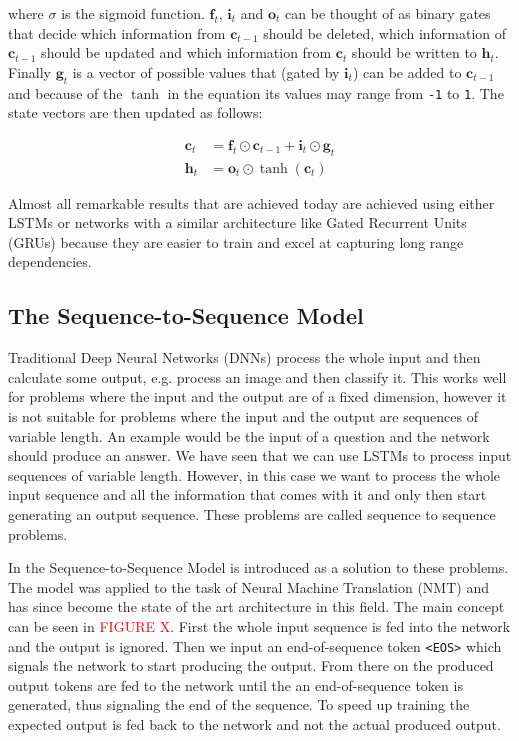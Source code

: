 \noindent where \(\sigma\) is the sigmoid function. \(\mathbf{f}_t\), \(\mathbf{i}_t\) and \(\mathbf{o}_t\) can be thought of as binary gates that decide which information from \(\mathbf{c}_{t-1}\) should be deleted, which information of \(\mathbf{c}_{t-1}\) should be updated and which information from \(\mathbf{c}_t\) should be written to \(\mathbf{h}_t\).  Finally \(\mathbf{g}_t\) is a vector of possible values that (gated by \(\mathbf{i}_t\)) can be added to \(\mathbf{c}_{t-1}\) and because of the \(\tanh\) in the equation its values may range from \texttt{-1} to \texttt{1}. The state vectors are then updated as follows:

\begin{align*}
  \mathbf{c}_t &= \mathbf{f}_t \odot \mathbf{c}_{t-1} + \mathbf{i}_t \odot \mathbf{g}_t \\
  \mathbf{h}_t &= \mathbf{o}_t \odot \tanh(\mathbf{c}_t)
\end{align*}

Almost all remarkable results that are achieved today are achieved using either LSTMs or networks with a similar architecture like Gated Recurrent Units (GRUs) because they are easier to train and excel at capturing long range dependencies.

\subsection{The Sequence-to-Sequence Model}

Traditional Deep Neural Networks (DNNs) process the whole input and then calculate some output, e.g. process an image and then classify it. This works well for problems where the input and the output are of a fixed dimension, however it is not suitable for problems where the input and the output are sequences of variable length. An example would be the input of a question and the network should produce an answer. We have seen that we can use LSTMs to process input sequences of variable length. However, in this case we want to process the whole input sequence and all the information that comes with it and only then start generating an output sequence. These problems are called sequence to sequence problems.

In \cite{seq2seq} the Sequence-to-Sequence Model is introduced as a solution to these problems. The model was applied to the task of Neural Machine Translation (NMT) and has since become the state of the art architecture in this field. The main concept can be seen in \textcolor{red}{FIGURE X}. First the whole input sequence is fed into the network and the output is ignored. Then we input an end-of-sequence token \texttt{<EOS>} which signals the network to start producing the output. From there on the produced output tokens are fed to the network until the an end-of-sequence token is generated, thus signaling the end of the sequence. To speed up training the expected output is fed back to the network and not the actual produced output.

